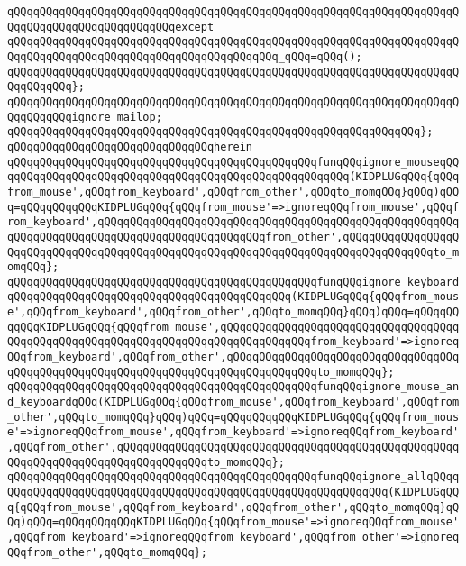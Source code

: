 \verb|qQQqqQQqqQQqqQQqqQQqqQQqqQQqqQQqqQQqqQQqqQQqqQQqqQQqqQQqqQQqqQQqqQQqqQQqqQQqqQQqqQQqqQQqqQQqqQQqexcept|\newline
\verb|qQQqqQQqqQQqqQQqqQQqqQQqqQQqqQQqqQQqqQQqqQQqqQQqqQQqqQQqqQQqqQQqqQQqqQQqqQQqqQQqqQQqqQQqqQQqqQQqqQQqqQQqqQQqqQQq_qQQq=qQQq();|\newline
\verb|qQQqqQQqqQQqqQQqqQQqqQQqqQQqqQQqqQQqqQQqqQQqqQQqqQQqqQQqqQQqqQQqqQQqqQQqqQQqqQQq};|\newline
\newline
\verb|qQQqqQQqqQQqqQQqqQQqqQQqqQQqqQQqqQQqqQQqqQQqqQQqqQQqqQQqqQQqqQQqqQQqqQQqqQQqqQQqignore_mailop;|\newline
\verb|qQQqqQQqqQQqqQQqqQQqqQQqqQQqqQQqqQQqqQQqqQQqqQQqqQQqqQQqqQQqqQQq};|\newline
\verb|qQQqqQQqqQQqqQQqqQQqqQQqqQQqqQQqherein|\newline
\newline
\verb|qQQqqQQqqQQqqQQqqQQqqQQqqQQqqQQqqQQqqQQqqQQqqQQqfunqQQqignore_mouseqQQqqQQqqQQqqQQqqQQqqQQqqQQqqQQqqQQqqQQqqQQqqQQqqQQqqQQq(KIDPLUGqQQq{qQQqfrom_mouse',qQQqfrom_keyboard',qQQqfrom_other',qQQqto_momqQQq}qQQq)qQQq=qQQqqQQqqQQqKIDPLUGqQQq{qQQqfrom_mouse'=>ignoreqQQqfrom_mouse',qQQqfrom_keyboard',qQQqqQQqqQQqqQQqqQQqqQQqqQQqqQQqqQQqqQQqqQQqqQQqqQQqqQQqqQQqqQQqqQQqqQQqqQQqqQQqqQQqqQQqqQQqqQQqfrom_other',qQQqqQQqqQQqqQQqqQQqqQQqqQQqqQQqqQQqqQQqqQQqqQQqqQQqqQQqqQQqqQQqqQQqqQQqqQQqqQQqqQQqto_momqQQq};|\newline
\verb|qQQqqQQqqQQqqQQqqQQqqQQqqQQqqQQqqQQqqQQqqQQqqQQqfunqQQqignore_keyboardqQQqqQQqqQQqqQQqqQQqqQQqqQQqqQQqqQQqqQQqqQQq(KIDPLUGqQQq{qQQqfrom_mouse',qQQqfrom_keyboard',qQQqfrom_other',qQQqto_momqQQq}qQQq)qQQq=qQQqqQQqqQQqKIDPLUGqQQq{qQQqfrom_mouse',qQQqqQQqqQQqqQQqqQQqqQQqqQQqqQQqqQQqqQQqqQQqqQQqqQQqqQQqqQQqqQQqqQQqqQQqqQQqqQQqqQQqfrom_keyboard'=>ignoreqQQqfrom_keyboard',qQQqfrom_other',qQQqqQQqqQQqqQQqqQQqqQQqqQQqqQQqqQQqqQQqqQQqqQQqqQQqqQQqqQQqqQQqqQQqqQQqqQQqqQQqqQQqto_momqQQq};|\newline
\verb|qQQqqQQqqQQqqQQqqQQqqQQqqQQqqQQqqQQqqQQqqQQqqQQqfunqQQqignore_mouse_and_keyboardqQQq(KIDPLUGqQQq{qQQqfrom_mouse',qQQqfrom_keyboard',qQQqfrom_other',qQQqto_momqQQq}qQQq)qQQq=qQQqqQQqqQQqKIDPLUGqQQq{qQQqfrom_mouse'=>ignoreqQQqfrom_mouse',qQQqfrom_keyboard'=>ignoreqQQqfrom_keyboard',qQQqfrom_other',qQQqqQQqqQQqqQQqqQQqqQQqqQQqqQQqqQQqqQQqqQQqqQQqqQQqqQQqqQQqqQQqqQQqqQQqqQQqqQQqqQQqto_momqQQq};|\newline
\verb|qQQqqQQqqQQqqQQqqQQqqQQqqQQqqQQqqQQqqQQqqQQqqQQqfunqQQqignore_allqQQqqQQqqQQqqQQqqQQqqQQqqQQqqQQqqQQqqQQqqQQqqQQqqQQqqQQqqQQqqQQq(KIDPLUGqQQq{qQQqfrom_mouse',qQQqfrom_keyboard',qQQqfrom_other',qQQqto_momqQQq}qQQq)qQQq=qQQqqQQqqQQqKIDPLUGqQQq{qQQqfrom_mouse'=>ignoreqQQqfrom_mouse',qQQqfrom_keyboard'=>ignoreqQQqfrom_keyboard',qQQqfrom_other'=>ignoreqQQqfrom_other',qQQqto_momqQQq};|\newline

